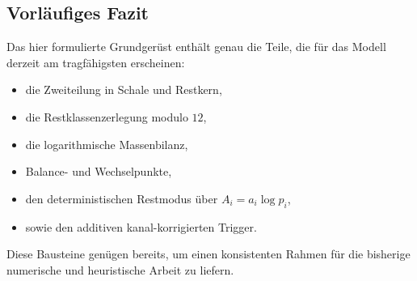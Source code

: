 \documentclass[11pt,a4paper]{article}
\begin{document}
	\subsection{Vorläufiges Fazit}
	
	\begin{bemerkung}
		Das hier formulierte Grundgerüst enthält genau die Teile, die für das Modell derzeit am tragfähigsten erscheinen:
		
		\begin{itemize}
			\item die Zweiteilung in Schale und Restkern,
			\item die Restklassenzerlegung modulo \(12\),
			\item die logarithmische Massenbilanz,
			\item Balance- und Wechselpunkte,
			\item den deterministischen Restmodus über \(A_i=a_i\log p_i\),
			\item sowie den additiven kanal-korrigierten Trigger.
		\end{itemize}
		
		Diese Bausteine genügen bereits, um einen konsistenten Rahmen für die bisherige numerische und heuristische Arbeit zu liefern.
	\end{bemerkung}
	
\end{document}
